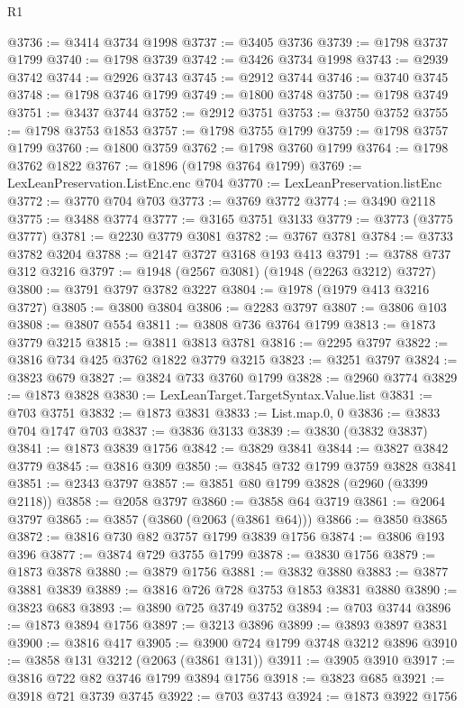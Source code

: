 \begin{lexlean}{R1}
\begin{coremodule}
@3736 := @3414 @3734 @1998
@3737 := @3405 @3736
@3739 := @1798 @3737 @1799
@3740 := @1798 @3739
@3742 := @3426 @3734 @1998
@3743 := @2939 @3742
@3744 := @2926 @3743
@3745 := @2912 @3744
@3746 := @3740 @3745
@3748 := @1798 @3746 @1799
@3749 := @1800 @3748
@3750 := @1798 @3749
@3751 := @3437 @3744
@3752 := @2912 @3751
@3753 := @3750 @3752
@3755 := @1798 @3753 @1853
@3757 := @1798 @3755 @1799
@3759 := @1798 @3757 @1799
@3760 := @1800 @3759
@3762 := @1798 @3760 @1799
@3764 := @1798 @3762 @1822
@3767 := @1896 (@1798 @3764 @1799)
@3769 := LexLeanPreservation.ListEnc.enc @704
@3770 := LexLeanPreservation.listEnc
@3772 := @3770 @704 @703
@3773 := @3769 @3772
@3774 := @3490 @2118
@3775 := @3488 @3774
@3777 := @3165 @3751 @3133
@3779 := @3773 (@3775 @3777)
@3781 := @2230 @3779 @3081
@3782 := @3767 @3781
@3784 := @3733 @3782 @3204
@3788 := @2147 @3727 @3168 @193 @413
@3791 := @3788 @737 @312 @3216
@3797 := @1948 (@2567 @3081) (@1948 (@2263 @3212) @3727)
@3800 := @3791 @3797 @3782 @3227
@3804 := @1978 (@1979 @413 @3216 @3727)
@3805 := @3800 @3804
@3806 := @2283 @3797
@3807 := @3806 @103
@3808 := @3807 @554
@3811 := @3808 @736 @3764 @1799
@3813 := @1873 @3779 @3215
@3815 := @3811 @3813 @3781
@3816 := @2295 @3797
@3822 := @3816 @734 @425 @3762 @1822 @3779 @3215
@3823 := @3251 @3797
@3824 := @3823 @679
@3827 := @3824 @733 @3760 @1799
@3828 := @2960 @3774
@3829 := @1873 @3828
@3830 := LexLeanTarget.TargetSyntax.Value.list
@3831 := @703 @3751
@3832 := @1873 @3831
@3833 := List.map.{0, 0}
@3836 := @3833 @704 @1747 @703
@3837 := @3836 @3133
@3839 := @3830 (@3832 @3837)
@3841 := @1873 @3839 @1756
@3842 := @3829 @3841
@3844 := @3827 @3842 @3779
@3845 := @3816 @309
@3850 := @3845 @732 @1799 @3759 @3828 @3841
@3851 := @2343 @3797
@3857 := @3851 @80 @1799 @3828 (@2960 (@3399 @2118))
@3858 := @2058 @3797
@3860 := @3858 @64 @3719
@3861 := @2064 @3797
@3865 := @3857 (@3860 (@2063 (@3861 @64)))
@3866 := @3850 @3865
@3872 := @3816 @730 @82 @3757 @1799 @3839 @1756
@3874 := @3806 @193 @396
@3877 := @3874 @729 @3755 @1799
@3878 := @3830 @1756
@3879 := @1873 @3878
@3880 := @3879 @1756
@3881 := @3832 @3880
@3883 := @3877 @3881 @3839
@3889 := @3816 @726 @728 @3753 @1853 @3831 @3880
@3890 := @3823 @683
@3893 := @3890 @725 @3749 @3752
@3894 := @703 @3744
@3896 := @1873 @3894 @1756
@3897 := @3213 @3896
@3899 := @3893 @3897 @3831
@3900 := @3816 @417
@3905 := @3900 @724 @1799 @3748 @3212 @3896
@3910 := @3858 @131 @3212 (@2063 (@3861 @131))
@3911 := @3905 @3910
@3917 := @3816 @722 @82 @3746 @1799 @3894 @1756
@3918 := @3823 @685
@3921 := @3918 @721 @3739 @3745
@3922 := @703 @3743
@3924 := @1873 @3922 @1756

\end{coremodule}
\end{lexlean}
